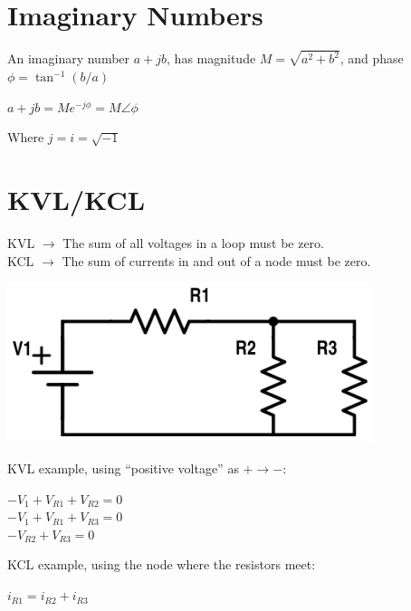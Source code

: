 \documentclass[12pt]{article}
\begin{document}

\section*{Imaginary Numbers}
An imaginary number $a+jb$, has magnitude $M = \sqrt{a^2+b^2}$, and phase $\phi = \tan^{-1}(b/a)$\\

\begin{center}
	$a+jb = Me^{-j\phi} = M\angle\phi $
\end{center}
Where $j = i = \sqrt{-1}$


\section*{KVL/KCL}
KVL $\rightarrow$ The sum of all voltages in a loop must be zero. \\
KCL $\rightarrow$ The sum of currents in and out of a node must be zero. \\

\begin{center}
	\includegraphics[width=0.8\textwidth]{assets/ece210-kvl.png}
\end{center}

KVL example, using ``positive voltage'' as $+\rightarrow-$:
\begin{center}
	$-V_1 + V_{R1} + V_{R2} = 0$\\
	$-V_1 + V_{R1} + V_{R3} = 0$\\
	$-V_{R2} + V_{R3} = 0$
\end{center}

KCL example, using the node where the resistors meet:
\begin{center}
	$i_{R1} = i_{R2} + i_{R3}$
\end{center}


\end{document}
